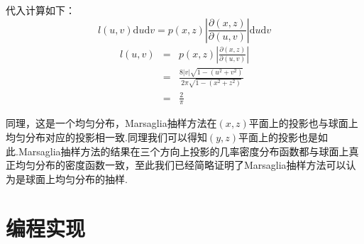 \documentclass[12pt,a4paper,utf8]{ctexart}
\begin{document}
代入计算如下：
\begin{equation}
    l(u,v) \textrm{d}u \textrm{d}v = p(x,z) \left | \frac{\partial
    (x,z)}{\partial (u,v)} \right |\textrm{d}u \textrm{d}v
\end{equation}
\begin{eqnarray}
    l(u,v) &=& p(x,z) \left | \frac{\partial (x,z)}{\partial (u,v)} \right |
    \nonumber \\
           &=& \frac{8|v| \sqrt{1-(u^2+v^2)}}{2\pi \sqrt{1-(x^2+z^2)}} \nonumber
           \\
           &=& \frac{2}{\pi}
\end{eqnarray}

同理，这是一个均匀分布，Marsaglia抽样方法在$(x,z)$平面上的投影也与球面上均匀分布对应的投影相一致.同理我们可以得知$(y,z)$平面上的投影也是如此.Marsaglia抽样方法的结果在三个方向上投影的几率密度分布函数都与球面上真正均匀分布的密度函数一致，至此我们已经简略证明了Marsaglia抽样方法可以认为是球面上均匀分布的抽样.
\newpage
\section{编程实现}
\end{document}
